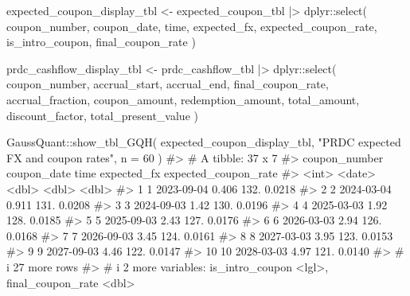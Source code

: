 \documentclass[
  letterpaper,
  DIV=11,
  numbers=noendperiod]{scrreprt}
\newenvironment{Shaded}{\begin{snugshade}}{\end{snugshade}}
\newcommand{\AttributeTok}[1]{\textcolor[rgb]{0.40,0.45,0.13}{#1}}
\newcommand{\CommentTok}[1]{\textcolor[rgb]{0.37,0.37,0.37}{#1}}
\newcommand{\DecValTok}[1]{\textcolor[rgb]{0.68,0.00,0.00}{#1}}
\newcommand{\FunctionTok}[1]{\textcolor[rgb]{0.28,0.35,0.67}{#1}}
\newcommand{\NormalTok}[1]{\textcolor[rgb]{0.00,0.23,0.31}{#1}}
\newcommand{\OtherTok}[1]{\textcolor[rgb]{0.00,0.23,0.31}{#1}}
\newcommand{\SpecialCharTok}[1]{\textcolor[rgb]{0.37,0.37,0.37}{#1}}
\newcommand{\StringTok}[1]{\textcolor[rgb]{0.13,0.47,0.30}{#1}}
\begin{document}
\begin{Shaded}
\begin{Highlighting}[]
\NormalTok{expected\_coupon\_display\_tbl }\OtherTok{\textless{}{-}}\NormalTok{ expected\_coupon\_tbl }\SpecialCharTok{|\textgreater{}}
\NormalTok{  dplyr}\SpecialCharTok{::}\FunctionTok{select}\NormalTok{(}
\NormalTok{    coupon\_number,}
\NormalTok{    coupon\_date,}
\NormalTok{    time,}
\NormalTok{    expected\_fx,}
\NormalTok{    expected\_coupon\_rate,}
\NormalTok{    is\_intro\_coupon,}
\NormalTok{    final\_coupon\_rate}
\NormalTok{  )}

\NormalTok{prdc\_cashflow\_display\_tbl }\OtherTok{\textless{}{-}}\NormalTok{ prdc\_cashflow\_tbl }\SpecialCharTok{|\textgreater{}}
\NormalTok{  dplyr}\SpecialCharTok{::}\FunctionTok{select}\NormalTok{(}
\NormalTok{    coupon\_number,}
\NormalTok{    accrual\_start,}
\NormalTok{    accrual\_end,}
\NormalTok{    final\_coupon\_rate,}
\NormalTok{    accrual\_fraction,}
\NormalTok{    coupon\_amount,}
\NormalTok{    redemption\_amount,}
\NormalTok{    total\_amount,}
\NormalTok{    discount\_factor,}
\NormalTok{    total\_present\_value}
\NormalTok{  )}

\NormalTok{GaussQuant}\SpecialCharTok{::}\FunctionTok{show\_tbl\_GQH}\NormalTok{(}
\NormalTok{  expected\_coupon\_display\_tbl,}
  \StringTok{"PRDC expected FX and coupon rates"}\NormalTok{,}
  \AttributeTok{n =} \DecValTok{60}
\NormalTok{)}
\CommentTok{\#\textgreater{} \# A tibble: 37 x 7}
\CommentTok{\#\textgreater{}    coupon\_number coupon\_date  time expected\_fx expected\_coupon\_rate}
\CommentTok{\#\textgreater{}            \textless{}int\textgreater{} \textless{}date\textgreater{}      \textless{}dbl\textgreater{}       \textless{}dbl\textgreater{}                \textless{}dbl\textgreater{}}
\CommentTok{\#\textgreater{}  1             1 2023{-}09{-}04  0.406        132.               0.0218}
\CommentTok{\#\textgreater{}  2             2 2024{-}03{-}04  0.911        131.               0.0208}
\CommentTok{\#\textgreater{}  3             3 2024{-}09{-}03  1.42         130.               0.0196}
\CommentTok{\#\textgreater{}  4             4 2025{-}03{-}03  1.92         128.               0.0185}
\CommentTok{\#\textgreater{}  5             5 2025{-}09{-}03  2.43         127.               0.0176}
\CommentTok{\#\textgreater{}  6             6 2026{-}03{-}03  2.94         126.               0.0168}
\CommentTok{\#\textgreater{}  7             7 2026{-}09{-}03  3.45         124.               0.0161}
\CommentTok{\#\textgreater{}  8             8 2027{-}03{-}03  3.95         123.               0.0153}
\CommentTok{\#\textgreater{}  9             9 2027{-}09{-}03  4.46         122.               0.0147}
\CommentTok{\#\textgreater{} 10            10 2028{-}03{-}03  4.97         121.               0.0140}
\CommentTok{\#\textgreater{} \# i 27 more rows}
\CommentTok{\#\textgreater{} \# i 2 more variables: is\_intro\_coupon \textless{}lgl\textgreater{}, final\_coupon\_rate \textless{}dbl\textgreater{}}


\end{Highlighting}
\end{Shaded}
\end{document}
